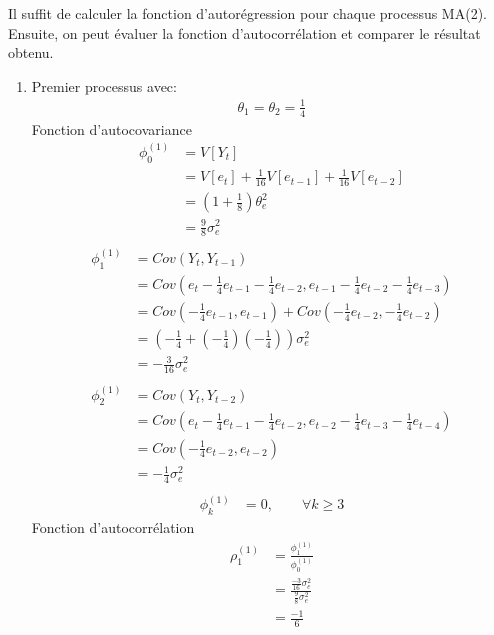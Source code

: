 \begin{solution}{2.5}
    Il suffit de calculer la fonction d'autorégression pour chaque processus MA(2).
Ensuite, on peut évaluer la fonction d'autocorrélation et comparer le résultat obtenu.

\begin{enumerate}
\item Premier processus avec:
\begin{align*}
\theta_1 = \theta_2 = \frac{1}{4}
\end{align*}
Fonction d'autocovariance
\begin{align*}
\phi_0^{(1)} &= V[Y_t] \\
&= V[e_t]+\frac{1}{16}V[e_{t-1}]+\frac{1}{16}V[e_{t-2}] \\
&= (1+\frac{1}{8})\theta^2_e \\
&= \frac{9}{8} \sigma^2_e \\
\end{align*}
\begin{align*}
\phi_1^{(1)} &= Cov(Y_t,Y_{t-1}) \\
&= Cov(e_t - \frac{1}{4}e_{t-1} - \frac{1}{4}e_{t-2}, e_{t-1} - \frac{1}{4}e_{t-2} - \frac{1}{4}e_{t-3} )\\
&= Cov(-\frac{1}{4}e_{t-1},e_{t-1}) + Cov(-\frac{1}{4}e_{t-2},-\frac{1}{4}e_{t-2}) \\
&= (-\frac{1}{4}+(-\frac{1}{4})(-\frac{1}{4})) \sigma^2_e \\
&= -\frac{3}{16} \sigma^2_e \\
\end{align*}
\begin{align*}
\phi_2^{(1)} &= Cov(Y_t,Y_{t-2}) \\
&= Cov(e_t - \frac{1}{4}e_{t-1} - \frac{1}{4}e_{t-2}, e_{t-2} - \frac{1}{4}e_{t-3} - \frac{1}{4}e_{t-4} )\\
&= Cov(-\frac{1}{4}e_{t-2},e_{t-2}) \\
&= -\frac{1}{4} \sigma^2_e \\
\end{align*}
\begin{align*}
\phi_k^{(1)} &= 0, \qquad \forall k \geq 3
\end{align*}
Fonction d'autocorrélation
\begin{align*}
\rho_1^{(1)} &= \frac{\phi_1^{(1)}}{\phi_0^{(1)}} \\
&= \frac{\frac{-3}{16}\sigma^2_e}{\frac{9}{8}\sigma^2_e} \\
&= \frac{-1}{6} \\
\end{align*}

\end{enumerate}
\end{solution}
